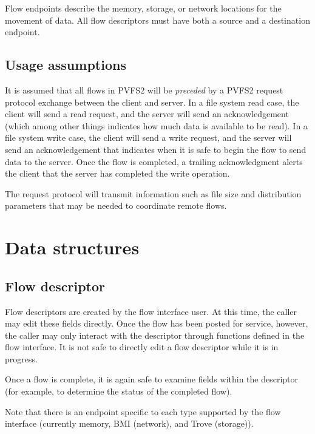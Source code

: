 \documentclass[12pt]{article} %
\begin{document}
Flow endpoints describe the memory, storage, or network locations for
the movement of data.   All flow descriptors must have both a 
source and a destination endpoint.

\subsection{Usage assumptions}

It is assumed that all flows in PVFS2 will be \emph{preceded} by a
PVFS2 request protocol exchange between the client and server.  In
a file system read case, the client will send a read request, and
the server will send an acknowledgement (which among other things
indicates how much data is available to be read).  In a file
system write case, the client will send a write request, and the
server will send an acknowledgement that indicates when it is safe
to begin the flow to send data to the server.  Once the flow is completed,
a trailing acknowledgment alerts the client that the server has 
completed the write operation.

The request protocol will transmit information such as file size and 
distribution parameters that may be needed to coordinate remote flows.

\section{Data structures}

\subsection{Flow descriptor}
\label{sec:flow-desc}

Flow descriptors are created by the flow interface user.  At this time,
the caller may edit these fields directly.  Once the flow has been posted
for service, however, the caller may only interact with the descriptor
through functions defined in the flow interface.  It is not safe to
directly edit a flow descriptor while it is in progress.

Once a flow is complete, it is again safe to examine fields within
the descriptor (for example, to determine the status of the
completed flow).

Note that there is an endpoint specific to each type supported by
the flow interface (currently memory, BMI (network), and Trove
(storage)).
\end{document}
